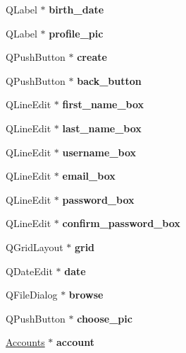 \begin{DoxyCompactItemize}
Q\+Label $\ast$ {\bfseries birth\+\_\+date}
\item 
\mbox{\label{classSignUpWidget_a8a753600dab790c3b5bccf2f93b6cd19}} 
Q\+Label $\ast$ {\bfseries profile\+\_\+pic}
\item 
\mbox{\label{classSignUpWidget_accb1b4beaa669d2d891810a0f787a0ff}} 
Q\+Push\+Button $\ast$ {\bfseries create}
\item 
\mbox{\label{classSignUpWidget_aaa15c1c254772a5a01297c65cd38acef}} 
Q\+Push\+Button $\ast$ {\bfseries back\+\_\+button}
\item 
\mbox{\label{classSignUpWidget_ad9f995214bd2ecaa2af05560d337ba8e}} 
Q\+Line\+Edit $\ast$ {\bfseries first\+\_\+name\+\_\+box}
\item 
\mbox{\label{classSignUpWidget_ab531f28d8a8fd43bdc4b082eb5a03b19}} 
Q\+Line\+Edit $\ast$ {\bfseries last\+\_\+name\+\_\+box}
\item 
\mbox{\label{classSignUpWidget_ade0126b2def6836a9af479b411db33d8}} 
Q\+Line\+Edit $\ast$ {\bfseries username\+\_\+box}
\item 
\mbox{\label{classSignUpWidget_a1a16c6e69a787d4789ae5e2e6aac4c65}} 
Q\+Line\+Edit $\ast$ {\bfseries email\+\_\+box}
\item 
\mbox{\label{classSignUpWidget_a5fdab01ff0659f8c78edce86dd98cb9d}} 
Q\+Line\+Edit $\ast$ {\bfseries password\+\_\+box}
\item 
\mbox{\label{classSignUpWidget_a59d1e8bc78a8a6e198f429d7ceb1c02f}} 
Q\+Line\+Edit $\ast$ {\bfseries confirm\+\_\+password\+\_\+box}
\item 
\mbox{\label{classSignUpWidget_aefd2037eaac426a55e70ef6012b6ad18}} 
Q\+Grid\+Layout $\ast$ {\bfseries grid}
\item 
\mbox{\label{classSignUpWidget_a2e9bd8ed6cff8539ef9674ea4a51e9ba}} 
Q\+Date\+Edit $\ast$ {\bfseries date}
\item 
\mbox{\label{classSignUpWidget_a3f831471d861ba3af213a77396a23578}} 
Q\+File\+Dialog $\ast$ {\bfseries browse}
\item 
\mbox{\label{classSignUpWidget_a33a531fb9826e6487a73024007092365}} 
Q\+Push\+Button $\ast$ {\bfseries choose\+\_\+pic}
\item 
\mbox{\label{classSignUpWidget_a0c1ff6b316473ede2347883dc5860146}} 
\hyperlink{classAccounts}{Accounts} $\ast$ {\bfseries account}
\end{DoxyCompactItemize}


